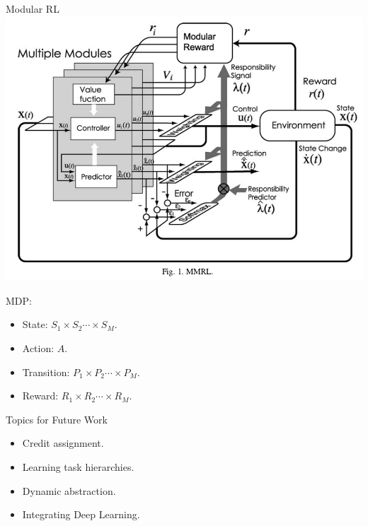 Modular RL
\includegraphics[width=0.8\columnwidth]{mrl.png}



MDP:
\begin{itemize}
  \item State: {\color{red}$S_1 \times S_2 \cdots \times S_M $}.
  \item Action: $A$.
  \item Transition: {\color{red}$P_1 \times P_2 \cdots \times P_M $}.
  \item Reward: {\color{red}$R_1 \times R_2 \cdots \times R_M $}.
\end{itemize}



Topics for Future Work
\begin{itemize}
  \item Credit assignment.
  \item Learning task hierarchies.
  \item Dynamic abstraction. 
  \item Integrating Deep Learning. 
\end{itemize}

